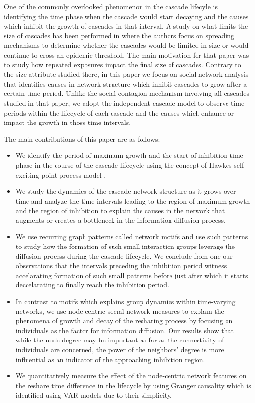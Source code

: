 \documentclass[smallextended]{svjour3}       %
\theoremstyle{definition}
\begin{document}
One of the commonly overlooked phenomenon in the cascade lifecyle is identifying the time phase when the cascade would start decaying and the causes which inhibit the growth of cascades in that interval. A study on what limits the size of cascades has been performed in \cite{stops_epid} where the authors focus on spreading mechanisms to determine whether the cascades would be limited in size or would continue to cross an epidemic threshold. The main motivation for that paper was to study how repeated exposures impact the final size of cascades. Contrary to the size attribute studied there, in this paper we focus on social network analysis that identifies causes in network structure which inhibit cascades to grow after a certain time period. Unlike the social contagion mechanism involving all cascades studied in that paper, we adopt the independent cascade model to observe time periods within the lifecycle of each cascade and the causes which enhance or impact the growth in those time intervals.

The main contributions of this paper are as follows:

\begin{itemize}
	\item We identify the period of maximum growth and the start of inhibition time phase in the course of the cascade lifecycle using the concept of Hawkes self exciting point process model \cite{hawkes_zha}\cite{seismic}. 
	
	\item We study the dynamics of the cascade network structure as it grows over time and analyze the time intervals leading to the region of maximum growth and the region of inhibition to explain the causes in the network that augments or creates a bottleneck in the information diffusion process.
	
	\item We use recurring graph patterns called network motifs and use such patterns to study how the formation of such small interaction groups leverage the diffusion process during the cascade lifecycle. We conclude from one our observations that the intervals preceding the inhibition period witness accelarating formation of such small patterns before just after which it starts deccelarating to finally reach the inhibition period. 
	
	\item In contrast to motifs which explains group dynamics within time-varying networks, we use node-centric social network measures to explain the phenomena of growth and decay of the resharing process by focusing on individuals as the factor for information diffusion. Our results show that while the node degree may be important as far as the connectivity of individuals are concerned, the power of the neighbors' degree is more influential as an indicator of the approaching inhibition region. 
	
	\item We quantitatively measure the effect of the node-centric network features on the reshare time difference in the lifecycle by using Granger causality \cite{granger_causality} which is identified using VAR models due to their simplicity. 
\end{itemize}
\end{document}
